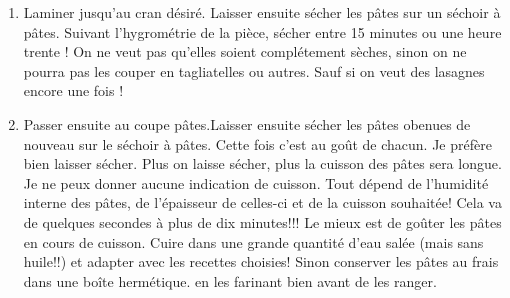 {\begin{enumerate}
	\item Laminer jusqu'au cran désiré. Laisser ensuite sécher les pâtes sur un séchoir à pâtes. Suivant l'hygrométrie de la pièce, sécher entre 15 minutes ou une heure trente ! On ne veut pas qu'elles soient complétement sèches, sinon on ne pourra pas les couper en tagliatelles ou autres. Sauf si on veut des lasagnes encore une fois !
	\item Passer ensuite au coupe pâtes.Laisser ensuite sécher les pâtes obenues de nouveau sur le séchoir à pâtes. Cette fois c'est au goût de chacun. Je préfère bien laisser sécher. Plus on laisse sécher, plus la cuisson des pâtes sera longue. Je ne peux donner aucune indication de cuisson. Tout dépend de l'humidité interne des pâtes, de l'épaisseur de celles-ci et de la cuisson souhaitée! Cela va de quelques secondes à plus de dix minutes!!! Le mieux est de goûter les pâtes en cours de cuisson. Cuire dans une grande quantité d'eau salée (mais sans huile!!) et adapter avec les recettes choisies! Sinon conserver les pâtes au frais dans une boîte hermétique. en les farinant bien avant de les ranger.
\end{enumerate}}

